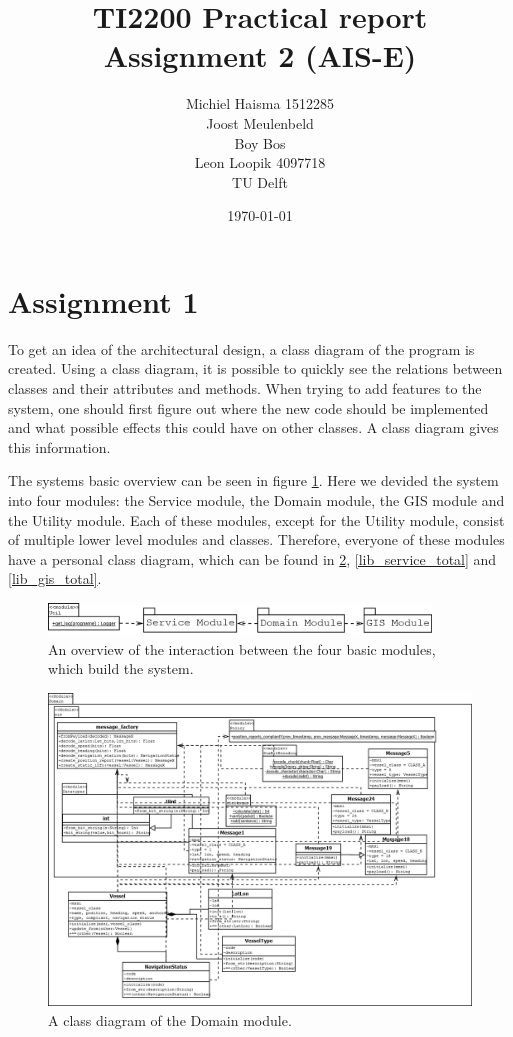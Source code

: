 \documentclass[12pt]{article}
\title{TI2200 Practical report\\
Assignment 2 (AIS-E)}
\author{Michiel Haisma 1512285\\
Joost Meulenbeld \\
Boy Bos\\
Leon Loopik 4097718\\
TU Delft\\}
\date{\today}
\begin{document}
\maketitle

\section*{Assignment 1}
To get an idea of the architectural design, a class diagram of the program is created. Using a class diagram, it is possible to quickly see the relations between classes and their attributes and methods. When trying to add features to the system, one should first figure out where the new code should be implemented and what possible effects this could have on other classes. A class diagram gives this information.

The systems basic overview can be seen in figure \ref{lib_total_overview}. Here we devided the system into four modules: the Service module, the Domain module, the GIS module and the Utility module. Each of these modules, except for the Utility module, consist of multiple lower level modules and classes. Therefore, everyone of these modules have a personal class diagram, which can be found in \ref{lib_domain_total}, \ref{lib_service_total} and \ref{lib_gis_total}.

\begin{figure}
  \centering
  \includegraphics[width=4in]{lib_total_overview}
  \caption{An overview of the interaction between the four basic modules, which build the system.}
  \label{lib_total_overview}
\end{figure}

\begin{figure}
  \centering
  \includegraphics[width=5in]{lib_domain_total}
  \caption{A class diagram of the Domain module.}
  \label{lib_domain_total}
\end{figure}
\end{document}

